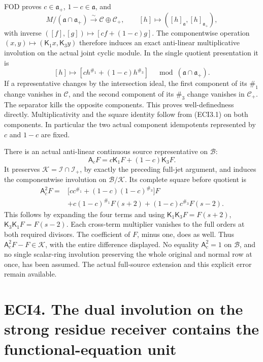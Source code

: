FOD proves \(c\in\mathfrak a_+\), \(1-c\in\mathfrak a\), and \[
M/(\mathfrak a\cap\mathfrak a_+)\xrightarrow{\sim}
\mathscr C\oplus\mathscr C_+,
\qquad[h]\mapsto([h]_{\mathfrak a},[h]_{\mathfrak a_+}),
\tag{ECI3.1}
\] with inverse \(([f],[g])\mapsto[cf+(1-c)g]\). The componentwise
operation \((x,y)\mapsto(\mathsf K_1x,\mathsf K_3y)\) therefore induces
an exact anti-linear multiplicative involution on the actual joint
cyclic module. In the single quotient presentation it is \[
[h]\longmapsto[c h^{\#_1}+(1-c)h^{\#_3}]
\quad\bmod(\mathfrak a\cap\mathfrak a_+).
\tag{ECI3.2}
\] If a representative changes by the intersection ideal, the first
component of its \(\#_1\) change vanishes in \(\mathscr C\), and the
second component of its \(\#_3\) change vanishes in \(\mathscr C_+\).
The separator kills the opposite components. This proves
well-definedness directly. Multiplicativity and the square identity
follow from (ECI3.1) on both components. In particular the two actual
component idempotents represented by \(c\) and \(1-c\) are fixed.

There is an actual anti-linear continuous source representative on
\(\mathcal B\): \[
\mathsf A_cF=c\mathsf K_1F+(1-c)\mathsf K_3F.
\tag{ECI3.3}
\] It preserves \(\mathcal K=\mathcal I\cap\mathcal I_+\), by exactly
the preceding full-jet argument, and induces the componentwise
involution on \(\mathcal B/\mathcal K\). Its complete square before
quotient is \[
\begin{aligned}
\mathsf A_c^2F={}&
\bigl[c c^{\#_1}+(1-c)(1-c)^{\#_3}\bigr]F\\
&+c(1-c)^{\#_1}F(s+2)
+(1-c)c^{\#_3}F(s-2).
\end{aligned}
\tag{ECI3.4}
\] This follows by expanding the four terms and using
\(\mathsf K_1\mathsf K_3F=F(s+2)\), \(\mathsf K_3\mathsf K_1F=F(s-2)\).
Each cross-term multiplier vanishes to the full orders at both required
divisors. The coefficient of \(F\), minus one, does as well. Thus
\(\mathsf A_c^2F-F\in\mathcal K\), with the entire difference displayed.
No equality \(\mathsf A_c^2=1\) on \(\mathcal B\), and no single
scalar-ring involution preserving the whole original and normal row at
once, has been assumed. The actual full-source extension and this
explicit error remain available.

\section{ECI4. The dual involution on the strong residue receiver
contains the functional-equation
unit}\label{eci4.-the-dual-involution-on-the-strong-residue-receiver-contains-the-functional-equation-unit}

